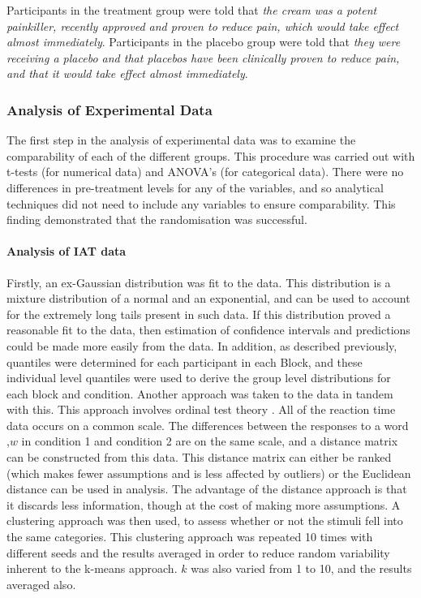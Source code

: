 Participants in the treatment group were told that \textit{the cream was a potent painkiller, recently approved and proven to reduce pain, which would take effect almost immediately}. Participants in the placebo group were told that \textit{they were receiving a placebo and that placebos have been clinically proven to reduce pain, and that it would take effect almost immediately}.

\subsubsection{Analysis of Experimental Data}

The first step in the analysis of experimental data was to examine the comparability of each of the different groups. This procedure was carried out with t-tests (for numerical data) and ANOVA's (for categorical data). There were no differences in pre-treatment levels for any of the variables, and so analytical techniques did not need to include any variables to ensure comparability. This finding demonstrated that the randomisation was successful. 

\paragraph{Analysis of IAT data}

Firstly,  an ex-Gaussian distribution was fit to the data. This distribution is a mixture distribution of a normal and an exponential, and can be used to account for the extremely long tails present in such data. If this distribution proved a reasonable fit to the data, then estimation of confidence intervals and predictions could be made more easily from the data.
In addition, as described previously, quantiles were determined for each participant in each Block, and these individual level quantiles were used to derive the group level distributions for each block and condition. 
Another approach was taken to the data in tandem with this. This approach involves ordinal test theory \cite{schulman1975test}. All of the reaction time data occurs on a common scale. The differences between the responses to a word ,$w$ in condition 1 and condition 2 are on the same scale, and a distance matrix can be constructed from this data. This distance matrix can either be ranked (which makes fewer assumptions and is less affected by outliers) or the Euclidean distance can be used in analysis. The advantage of the distance approach is that it discards less information, though at the cost of making more assumptions. A clustering approach was then used, to assess whether or not the stimuli fell into the same categories. This clustering approach was repeated 10 times with different seeds and the results averaged in order to reduce random variability inherent to the k-means approach. $k$ was also varied from 1 to 10, and the results averaged also.

